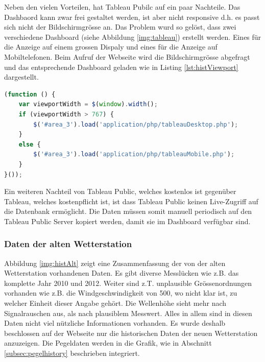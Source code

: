 \noindent
Neben den vielen Vorteilen, hat Tableau Pubilc auf ein paar Nachteile. Das Dashbaord kann zwar frei gestaltet werden, ist aber nicht responsive d.h. es passt sich nicht der Bildschirmgrösse an. Das Problem wurd so gelöst, dass zwei verschiedene Dashboard (siehe Abbildung \ref{img:tableau}) erstellt werden. Eines für die Anzeige auf einem grossen Dispaly und eines für die Anzeige auf Mobiltelefonen. Beim Aufruf der Webseite wird die Bildschirmgrösse abgefragt und das entsprechende Dashboard geladen wie in Listing \ref{lst:histViewport} dargestellt.

\begin{lstlisting}[label=lst:histViewport,caption=Auswahl des Dashboards anahnd der Bildschirmgrösse, language=JavaScript, style=htmlcssjs]
(function () {
	var viewportWidth = $(window).width();
	if (viewportWidth > 767) {
		$('#area_3').load('application/php/tableauDesktop.php');
	}
	else {
		$('#area_3').load('application/php/tableauMobile.php');
	}
}());
\end{lstlisting}


\noindent
Ein weiteren Nachteil von Tableau Public, welches kostenlos ist gegenüber Tableau, welches kostenpflicht ist, ist dass Tableau Public keinen Live-Zugriff auf die Datenbank ermöglicht. Die Daten müssen somit manuell periodisch auf den Tableau Public Server kopiert werden, damit sie im Dashboard verfügbar sind.



\subsubsection{Daten der alten Wetterstation}
Abbildung \ref{img:histAlt} zeigt eine Zusammenfassung der von der alten Wetterstation vorhandenen Daten. Es gibt diverse Messlücken wie z.B. das komplette Jahr 2010 und 2012. Weiter sind z.T. unplausible Grössenordnungen vorhanden wie z.B. die Windgeschwindigkeit von 500, wo nicht klar ist, zu welcher Einheit dieser Angabe gehört. Die Wellenhöhe sieht mehr nach Signalrauschen aus, als nach plausiblem Messwert. Alles in allem sind in diesen Daten nicht viel nützliche Informationen vorhanden. Es wurde deshalb beschlossen auf der Webseite nur die historischen Daten der neuen Wetterstation anzuzeigen. Die Pegeldaten werden in die Grafik, wie in Abschnitt \ref{subsec:pegelhistory} beschrieben integriert.

